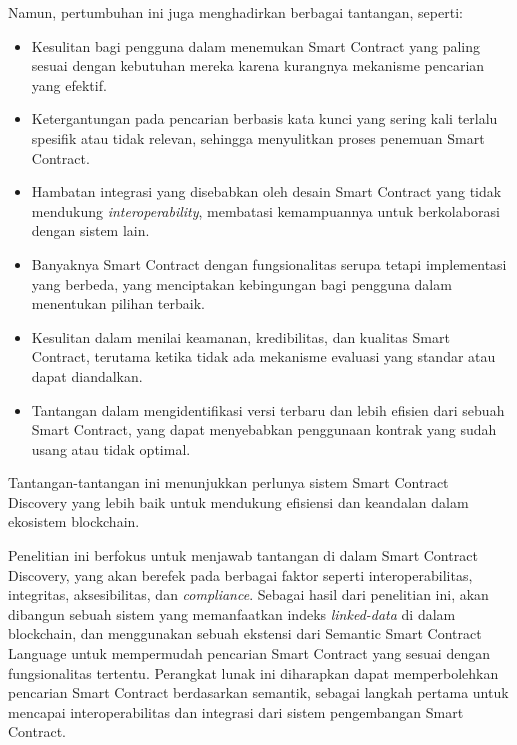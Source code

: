 Namun, pertumbuhan ini juga menghadirkan berbagai tantangan, seperti:
\begin{itemize}
    \item Kesulitan bagi pengguna dalam menemukan Smart Contract yang paling sesuai dengan kebutuhan mereka karena kurangnya mekanisme pencarian yang efektif.
    \item Ketergantungan pada pencarian berbasis kata kunci yang sering kali terlalu spesifik atau tidak relevan, sehingga menyulitkan proses penemuan Smart Contract.
    \item Hambatan integrasi yang disebabkan oleh desain Smart Contract yang tidak mendukung \textit{interoperability}, membatasi kemampuannya untuk berkolaborasi dengan sistem lain.
    \item Banyaknya Smart Contract dengan fungsionalitas serupa tetapi implementasi yang berbeda, yang menciptakan kebingungan bagi pengguna dalam menentukan pilihan terbaik.
    \item Kesulitan dalam menilai keamanan, kredibilitas, dan kualitas Smart Contract, terutama ketika tidak ada mekanisme evaluasi yang standar atau dapat diandalkan.
    \item Tantangan dalam mengidentifikasi versi terbaru dan lebih efisien dari sebuah Smart Contract, yang dapat menyebabkan penggunaan kontrak yang sudah usang atau tidak optimal.
\end{itemize}

Tantangan-tantangan ini menunjukkan perlunya sistem Smart Contract Discovery yang lebih baik untuk mendukung efisiensi dan keandalan dalam ekosistem blockchain.



Penelitian ini berfokus untuk menjawab tantangan di dalam Smart Contract Discovery, yang akan berefek pada berbagai faktor seperti interoperabilitas, integritas, aksesibilitas, dan \textit{compliance}. Sebagai hasil dari penelitian ini, akan dibangun sebuah sistem yang memanfaatkan indeks \textit{linked-data} di dalam blockchain, dan menggunakan sebuah ekstensi dari Semantic Smart Contract Language untuk mempermudah pencarian Smart Contract yang sesuai dengan fungsionalitas tertentu. Perangkat lunak ini diharapkan dapat memperbolehkan pencarian Smart Contract berdasarkan semantik, sebagai langkah pertama untuk mencapai interoperabilitas dan integrasi dari sistem pengembangan Smart Contract.

